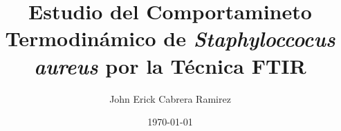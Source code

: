 \documentclass[%
 reprint,
 amsmath,amssymb,
 aps,
]{revtex4-2}
\begin{document}
\title{Estudio del Comportamineto Termodin\'{a}mico de \textit{Staphyloccocus aureus} por la T\'{e}cnica FTIR}%


\author{John Erick Cabrera Ramirez}


\date{\today}%
\end{document}
